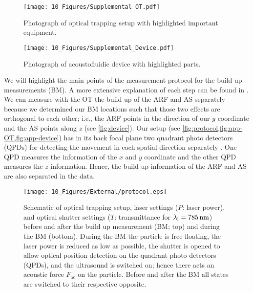 \begin{figure}[tbp]
  \centering
  \texttt{[image: 10\_Figures/Supplemental\_OT.pdf]}
  \caption{Photograph of optical trapping setup with highlighted important 
  equipment.\label{fig:app-OT}}
\end{figure}

\begin{figure}[tbp]
  \centering
  \texttt{[image: 10\_Figures/Supplemental\_Device.pdf]}
  \caption{Photograph of acoustofluidic device with highlighted parts. 
  \label{fig:app-device}}
\end{figure}

We will highlight the main points of the measurement protocol for the build up 
measurements (BM). A more extensive explanation of each step can be found in 
\citeauthor{Goering2021} \cite{Goering2021}. We can measure with the OT the 
build up of the ARF and AS separately because we determined our BM locations 
such that those two effects are orthogonal to each other; i.e., the ARF points 
in the direction of our $y$ coordinate and the AS points along $z$ (see 
\cref{fig:device}). Our setup (see 
\cref{fig:protocol,fig:app-OT,fig:app-device}) has in its back focal plane two 
quadrant photo detectors (QPDs) for detecting the movement in each spatial 
direction separately 
\cite{Lakaemper2015,Goering2021,Lamprecht2021,Lamprecht2016}. One QPD measures 
the information of the $x$ and $y$ coordinate and the other QPD measures the 
$z$ information. Hence, the build up information of the ARF and AS are also 
separated in the data.

\begin{figure*}[tbp]
  \centering
  \texttt{[image: 10\_Figures/External/protocol.eps]}
  \caption{Schematic of optical trapping setup, laser settings ($P$: laser 
    power), and optical shutter settings ($T$: transmittance for $\llaser = 
    \SI{785}{\nm}$) before and after the build up measurement (BM; top) and 
    during the BM (bottom). During the BM the particle is free floating, the 
    laser power is reduced as low as possible, the shutter is opened to allow 
    optical position detection on the quadrant photo detectors (QPDs), and the 
    ultrasound is switched on; hence there acts an acoustic force 
    $F_{\mathrm{ac}}$ on the particle. Before and after the BM all states are 
switched to their respective opposite.}\label{fig:protocol}
\end{figure*}


